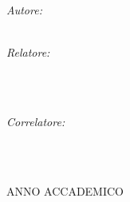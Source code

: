 \begin{titlepage}
\begin{center}
    \begin{minipage}[t]{0.49\textwidth}
    \begin{flushleft} \large
    \emph{Autore:}\\
    \spacedlowsmallcaps{\myName}\\
    \spacedlowsmallcaps{\myMatricola}
    \end{flushleft}
    \end{minipage}
    \begin{minipage}[t]{0.49\textwidth}
    \begin{flushright} \large
    \emph{Relatore:} \\
    \spacedlowsmallcaps{\myRelator}\\
    \spacedlowsmallcaps{\myRelCourse}
    \end{flushright}
    \end{minipage}\\[0.5cm]
    \begin{minipage}[t]{0.99\textwidth}
    \begin{flushright} \large
    \emph{Correlatore:} \\
    \spacedlowsmallcaps{\myCorRelator}\\
    \spacedlowsmallcaps{\myCorRelCourse}
    \end{flushright}
    \end{minipage}\\

    \vfill

    ANNO ACCADEMICO \myAA

  \end{center}
\end{titlepage}
